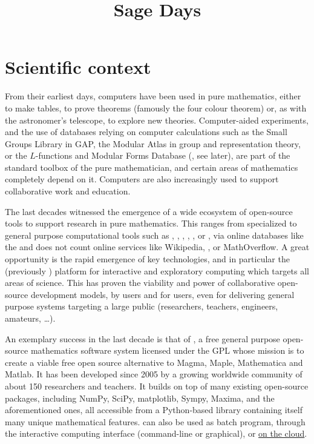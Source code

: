 \documentclass[12pt]{amsbook}
\begin{document}
\title{Sage Days}

\section{Scientific context}


From their earliest days, computers have been used in pure
mathematics, either to make tables, to prove theorems (famously the
four colour theorem) or, as with the astronomer's telescope, to
explore new theories. Computer-aided experiments, and the use of
databases relying on computer calculations such as the Small Groups
Library in GAP, the Modular Atlas in group and representation theory,
or the $L$-functions and Modular Forms Database (\LMFDB, see later),
are part of the standard toolbox of the pure mathematician, and
certain areas of mathematics completely depend on it. Computers are
also increasingly used to support collaborative work and education.

The last decades witnessed the emergence of a wide ecosystem of
open-source tools to support research in pure mathematics. This ranges
from specialized to general purpose computational tools such as \GAP,
\PariGP, \Linbox, \MPIR, \Sage, or \Singular, via online databases
like the \LMFDB and does not count online services like Wikipedia,
\Arxiv, or MathOverflow. A great opportunity is the rapid emergence of
key technologies, and in particular the \Jupyter (previously \IPython)
platform for interactive and exploratory computing which targets all
areas of science. This has proven the viability and power of
collaborative open-source development models, by users and for users,
even for delivering general purpose systems targeting a large public
(researchers, teachers, engineers, amateurs, \ldots).

An exemplary success in the last decade is that of \Sage,
a free general purpose open-source mathematics
software system licensed under the GPL whose mission is to create a
viable free open source alternative to Magma, Maple, Mathematica and
Matlab. It has been developed since 2005 by a growing worldwide community of
about 150 researchers and teachers. It builds on top of many existing
open-source packages, including NumPy, SciPy, matplotlib, Sympy,
Maxima, and the aforementioned ones, all accessible from a
Python-based library containing itself many unique mathematical
features. \Sage can also be used as batch program, through the
\Jupyter interactive computing interface (command-line or graphical),
or \href{cloud.sagemath.org}{on the cloud}.
\end{document}
